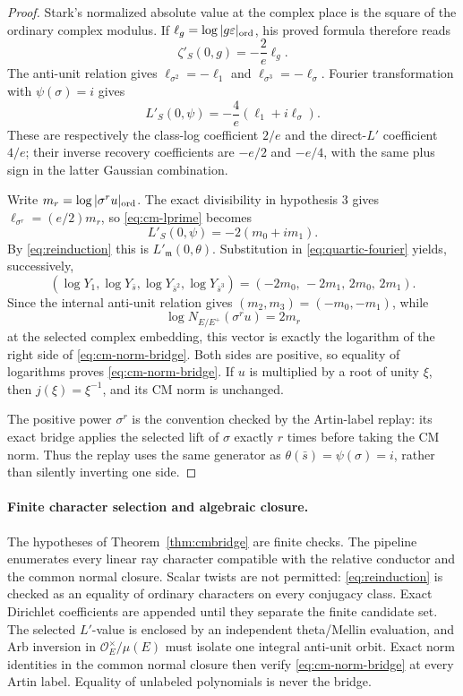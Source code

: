 \documentclass[11pt]{article}
\begin{document}
\begin{proof}
Stark's normalized absolute value at the complex place is the square
of the ordinary complex modulus.  If
\(\ell_g=\log|g\varepsilon|_{\rm ord}\), his proved formula therefore
reads
\begin{equation}\label{eq:stark-class-log}
 \zeta'_S(0,g)=-\frac2e\ell_g.
\end{equation}
The anti-unit relation gives
\(\ell_{\sigma^2}=-\ell_1\) and
\(\ell_{\sigma^3}=-\ell_\sigma\).  Fourier transformation with
\(\psi(\sigma)=i\) gives
\begin{equation}\label{eq:cm-lprime}
 L'_S(0,\psi)
 =-\frac4e(\ell_1+i\ell_\sigma).
\end{equation}
These are respectively the class-log coefficient \(2/e\) and the
direct-\(L'\) coefficient \(4/e\); their inverse recovery
coefficients are \(-e/2\) and \(-e/4\), with the same plus sign in
the latter Gaussian combination.

Write \(m_r=\log|\sigma^ru|_{\rm ord}\).  The exact divisibility in
hypothesis 3 gives \(\ell_{\sigma^r}=(e/2)m_r\), so
\eqref{eq:cm-lprime} becomes
\[
 L'_S(0,\psi)=-2(m_0+im_1).
\]
By \eqref{eq:reinduction} this is
\(L'_{\mathfrak m}(0,\theta)\).  Substitution in
\eqref{eq:quartic-fourier} yields, successively,
\[
 (\log Y_1,\log Y_{\bar s},\log Y_{\bar s^2},
   \log Y_{\bar s^3})
 =(-2m_0,\,-2m_1,\,2m_0,\,2m_1).
\]
Since the internal anti-unit relation gives
\((m_2,m_3)=(-m_0,-m_1)\), while
\[
 \log N_{E/E^+}(\sigma^ru)=2m_r
\]
at the selected complex embedding, this vector is exactly the
logarithm of the right side of \eqref{eq:cm-norm-bridge}.  Both sides
are positive, so equality of logarithms proves
\eqref{eq:cm-norm-bridge}.  If \(u\) is multiplied by a
root of unity \(\xi\), then \(j(\xi)=\xi^{-1}\), and its CM norm is
unchanged.

The positive power \(\sigma^r\) is the convention checked by the
Artin-label replay: its exact bridge applies the selected lift of
\(\sigma\) exactly \(r\) times before taking the CM norm.  Thus the
replay uses the same generator as
\(\theta(\bar s)=\psi(\sigma)=i\), rather than silently inverting one
side.
\end{proof}

\paragraph{Finite character selection and algebraic closure.}
The hypotheses of Theorem~\ref{thm:cmbridge} are finite checks.  The
pipeline enumerates every linear ray character compatible with the
relative conductor and the common normal closure.  Scalar twists are
not permitted: \eqref{eq:reinduction} is checked as an equality of ordinary characters
on every conjugacy class.  Exact Dirichlet coefficients are appended
until they separate the finite candidate set.  The selected
\(L'\)-value is enclosed by an independent theta/Mellin evaluation,
and Arb inversion in
\(\mathcal O_E^\times/\mu(E)\) must isolate one integral anti-unit
orbit.  Exact norm identities in the common normal closure then
verify \eqref{eq:cm-norm-bridge} at every Artin label.  Equality of
unlabeled polynomials
is never the bridge.
\end{document}
